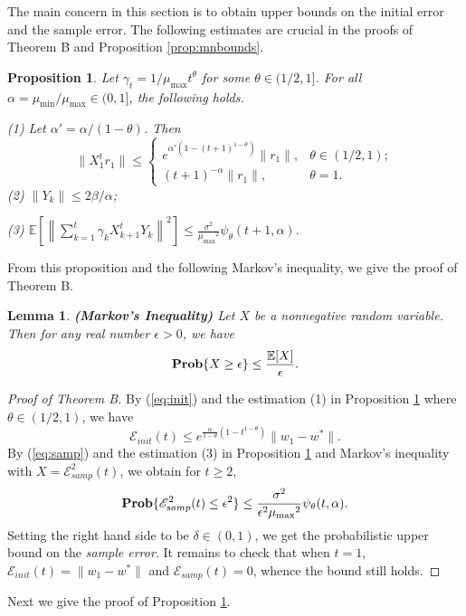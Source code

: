 \documentclass[twoside]{amsart}
\theoremstyle{theorem}
\newtheorem{lem}[thm]{Lemma}
\newtheorem{prop}[thm]{Proposition}
\theoremstyle{definition}
\theoremstyle{remark}
\def\Err{{\mathscr E}}
\def\Prob{{\bf Prob}}
\def\amax{{\mu_{\max}}}
\def\amin{{\mu_{\min}} }
\newcommand{\DS}{\displaystyle}
\def\E{{\mathbb E}}        %
\begin{document}
The main concern in this section is to obtain upper bounds on the initial error and the sample error. The following estimates are crucial in
the proofs of Theorem B and Proposition \ref{prop:mnbounds}.

\begin{prop} \label{prop:main} Let $\gamma_t = 1/\amax t^\theta$ for some $\theta\in(1/2,1]$.
For all $\alpha=\amin/\amax \in(0,1]$, the following holds.

\noindent (1) Let $\alpha'=\alpha/(1-\theta)$. Then
\[ \|X_1^t r_1 \| \leq
\left\{
\begin{array}{ll}
\DS e^{\alpha'(1-(t+1)^{1-\theta})} \| r_1 \|, & \theta\in(1/2,1); \\
\DS (t+1)^{-\alpha} \|r_1\|, & \theta=1.
\end{array}
\right.
\]
\noindent (2) $\|Y_k \| \leq 2\beta/\alpha$;

\noindent (3) $\DS \E\left[\left\|\sum_{k=1}^{t}\gamma_k X_{k+1}^tY_k\right\|^2\right] \leq
\frac{\sigma^2}{\amax^2} \psi_\theta(t+1,\alpha). $
\end{prop}

From this proposition and the following Markov's inequality, we give the proof of Theorem B.

\begin{lem} {\bf (Markov's Inequality)} Let $X$ be a nonnegative random variable.
Then for any real number $\epsilon>0$, we have
\[ \Prob\{ X\geq \epsilon \} \leq \frac{\E[X]}{\epsilon}. \]
\end{lem}

\begin{proof}[Proof of Theorem B]
By (\ref{eq:init}) and the estimation (1) in Proposition \ref{prop:main} where $\theta\in(1/2,1)$, we have
\[ \Err_{init}(t) \leq e^{\frac{\alpha}{1-\theta}(1- t^{1-\theta})} \| w_1 - w^\ast \|. \]
By (\ref{eq:samp}) and the estimation (3) in Proposition \ref{prop:main} and Markov's inequality with $X=\Err_{samp}^2(t)$, we obtain for $t\geq 2$,
\[ \Prob \{ \Err_{samp}^2(t) \leq \epsilon^2 \} \leq \frac{\sigma^2}{\epsilon^2\amax^2}\psi_\theta(t,\alpha). \]
Setting the right hand side to be $\delta\in (0,1)$, we get the probabilistic upper bound on the \emph{sample error}. It remains to check that when
$t=1$, $\Err_{init}(t)=\|w_1 - w^\ast\|$ and $\Err_{samp}(t)=0$, whence the bound still holds.
\end{proof}

Next we give the proof of Proposition \ref{prop:main}.
\end{document}
